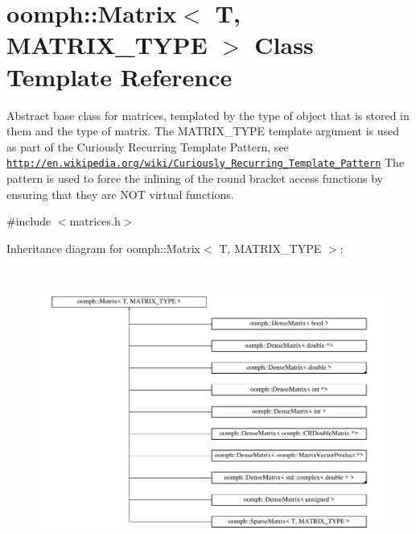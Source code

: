 \hypertarget{classoomph_1_1Matrix}{}\section{oomph\+:\+:Matrix$<$ T, M\+A\+T\+R\+I\+X\+\_\+\+T\+Y\+PE $>$ Class Template Reference}
\label{classoomph_1_1Matrix}


Abstract base class for matrices, templated by the type of object that is stored in them and the type of matrix. The M\+A\+T\+R\+I\+X\+\_\+\+T\+Y\+PE template argument is used as part of the Curiously Recurring Template Pattern, see \href{http://en.wikipedia.org/wiki/Curiously_Recurring_Template_Pattern}{\tt http\+://en.\+wikipedia.\+org/wiki/\+Curiously\+\_\+\+Recurring\+\_\+\+Template\+\_\+\+Pattern} The pattern is used to force the inlining of the round bracket access functions by ensuring that they are N\+OT virtual functions.  




{\ttfamily \#include $<$matrices.\+h$>$}

Inheritance diagram for oomph\+:\+:Matrix$<$ T, M\+A\+T\+R\+I\+X\+\_\+\+T\+Y\+PE $>$\+:\begin{figure}[H]
\begin{center}
\leavevmode
\includegraphics[height=9.476923cm]{classoomph_1_1Matrix}
\end{center}
\end{figure}
